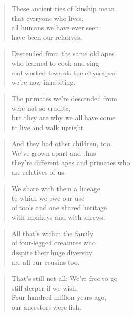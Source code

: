 \documentclass[14pt,a4paper]{article}
\begin{document}
\begin{verse}
These ancient ties of kinship mean\\
that everyone who lives,\\
all humans we have ever seen\\
have been our relatives.
\end{verse}

\begin{verse}
Descended from the same old apes\\
who learned to cook and sing\\
and worked towards the cityscapes\\
we’re now inhabiting.
\end{verse}

\begin{verse}
The primates we’re descended from\\
were not so erudite,\\
but they are why we all have come\\
to live and walk upright.
\end{verse}

\begin{verse}
And they had other children, too.\\
We’ve grown apart and thus\\
they’re different apes and primates who\\
are relatives of us.
\end{verse}

\begin{verse}
We share with them a lineage\\
to which we owe our use\\
of tools and one shared heritage\\
with monkeys and with shrews.
\end{verse}

\begin{verse}
All that’s within the family\\
of four-legged creatures who\\
despite their huge diversity\\
are all our cousins too.
\end{verse}

\begin{verse}
That’s still not all: We’re free to go\\
still deeper if we wish.\\
Four hundred million years ago,\\
our ancestors were fish.
\end{verse}
\end{document}
